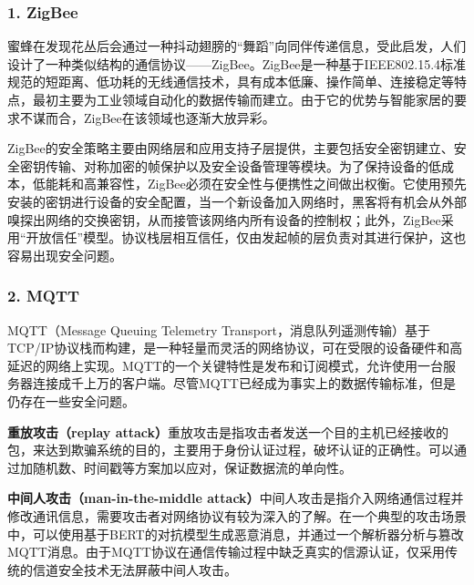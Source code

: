 \subsubsection{\textcolor{myblue}{\textbf{1. ZigBee}}}
\par 蜜蜂在发现花丛后会通过一种抖动翅膀的“舞蹈”向同伴传递信息，受此启发，人们设计了一种类似结构的通信协议——ZigBee。ZigBee是一种基于IEEE802.15.4标准规范的短距离、低功耗的无线通信技术，具有成本低廉、操作简单、连接稳定等特点，最初主要为工业领域自动化的数据传输而建立。由于它的优势与智能家居的要求不谋而合，ZigBee在该领域也逐渐大放异彩。
\par ZigBee的安全策略主要由网络层和应用支持子层提供，主要包括安全密钥建立、安全密钥传输、对称加密的帧保护以及安全设备管理等模块。为了保持设备的低成本，低能耗和高兼容性，ZigBee必须在安全性与便携性之间做出权衡。它使用预先安装的密钥进行设备的安全配置，当一个新设备加入网络时，黑客将有机会从外部嗅探出网络的交换密钥，从而接管该网络内所有设备的控制权；此外，ZigBee采用“开放信任”模型。协议栈层相互信任，仅由发起帧的层负责对其进行保护，这也容易出现安全问题。

\subsubsection{\textcolor{myblue}{\textbf{2. MQTT}}}
\par MQTT（Message Queuing Telemetry Transport，消息队列遥测传输）基于TCP/IP协议栈而构建，是一种轻量而灵活的网络协议，可在受限的设备硬件和高延迟的网络上实现。MQTT的一个关键特性是发布和订阅模式，允许使用一台服务器连接成千上万的客户端。尽管MQTT已经成为事实上的数据传输标准，但是仍存在一些安全问题\cite{chen2020a}。
\par \textcolor{myblue}{\textbf{重放攻击（replay attack）}}\quad 重放攻击是指攻击者发送一个目的主机已经接收的包，来达到欺骗系统的目的，主要用于身份认证过程，破坏认证的正确性。可以通过加随机数、时间戳等方案加以应对，保证数据流的单向性。
\par \textcolor{myblue}{\textbf{中间人攻击（man-in-the-middle attack）}}\quad 中间人攻击是指介入网络通信过程并修改通讯信息，需要攻击者对网络协议有较为深入的了解。在一个典型的攻击场景中，可以使用基于BERT的对抗模型生成恶意消息，并通过一个解析器分析与篡改MQTT消息\cite{wong2020man}。由于MQTT协议在通信传输过程中缺乏真实的信源认证，仅采用传统的信道安全技术无法屏蔽中间人攻击。

